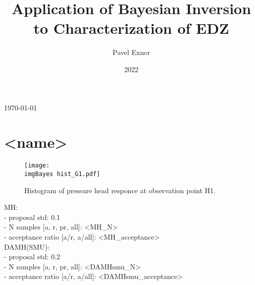 \documentclass{article}
\title{Application of Bayesian Inversion to Characterization of EDZ}
\author{Pavel Exner}
\date{2022}
\newcommand{\imgBayes}{saved_samples/config_mcmc_bayes/img_Bayes/}
\begin{document}
\begin{center}
\today
\end{center}

\section{<name>}


\begin{figure}[htb!]
    \centering
    \texttt{[image: \\imgBayes hist\_G1.pdf]}
    \caption{Histogram of pressure head responce at observation point H1.}
    \label{fig:hist_G1}
\end{figure}


\cleardoublepage

\Large


\vspace{10pt}
MH:\\
- proposal std: 0.1\\
- N samples [a, r, pr, all]: <MH_N>\\
- acceptance ratio [a/r, a/all]: <MH_acceptance>\\

DAMH(SMU):\\
- proposal std: 0.2\\
- N samples [a, r, pr, all]: <DAMHsmu_N>\\
- acceptance ratio [a/r, a/all]: <DAMHsmu_acceptance>\\

\end{document}
